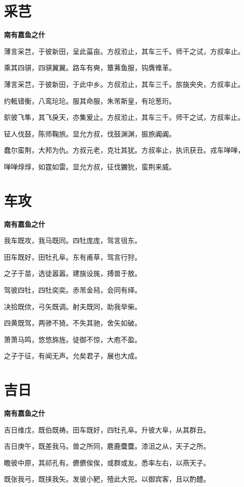 \documentclass[12pt,a4paper]{ctexbook}
\begin{document}
\section{采芑}
\textbf{南有嘉鱼之什}\par\vspace{0.5em}
薄言采芑，于彼新田，呈此菑亩。方叔涖止，其车三千。师干之试，方叔率止。\par
乘其四骐，四骐翼翼。路车有奭，簟茀鱼服，钩膺鞗革。\par
薄言采芑，于彼新田，于此中乡。方叔涖止，其车三千。旂旐央央，方叔率止。\par
约軧错衡，八鸾玱玱。服其命服，朱芾斯皇，有玱葱珩。\par
鴥彼飞隼，其飞戾天，亦集爰止。方叔涖止，其车三千。师干之试，方叔率止。\par
钲人伐鼓，陈师鞠旅。显允方叔，伐鼓渊渊，振旅阗阗。\par
蠢尔蛮荆，大邦为仇。方叔元老，克壮其犹。方叔率止，执讯获丑。戎车啴啴，\par
啴啴焞焞，如霆如雷。显允方叔，征伐玁狁，蛮荆来威。\par

\section{车攻}
\textbf{南有嘉鱼之什}\par\vspace{0.5em}
我车既攻，我马既同。四牡庞庞，驾言徂东。\par
田车既好，田牡孔阜。东有甫草，驾言行狩。\par
之子于苗，选徒嚣嚣。建旐设旄，搏兽于敖。\par
驾彼四牡，四牡奕奕。赤芾金舄，会同有绎。\par
决拾既佽，弓矢既调。射夫既同，助我举柴。\par
四黄既驾，两骖不猗。不失其驰，舍矢如破。\par
萧萧马鸣，悠悠旆旌。徒御不惊，大庖不盈。\par
之子于征，有闻无声。允矣君子，展也大成。\par

\section{吉日}
\textbf{南有嘉鱼之什}\par\vspace{0.5em}
吉日维戊，既伯既祷。田车既好，四牡孔阜。升彼大阜，从其群丑。\par
吉日庚午，既差我马。兽之所同，麀鹿麌麌。漆沮之从，天子之所。\par
瞻彼中原，其祁孔有。儦儦俟俟，或群或友。悉率左右，以燕天子。\par
既张我弓，既挟我矢。发彼小豝，殪此大兕。以御宾客，且以酌醴。\par
\end{document}
